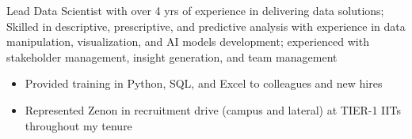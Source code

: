 
\item{Lead Data Scientist with over 4 yrs of experience in delivering data solutions; Skilled in descriptive, prescriptive, and predictive analysis with experience in data manipulation, visualization, and AI models development; experienced with stakeholder management, insight generation, and team management}







\vspace{.3px}
\vspace{.3px}








\vspace{.3px}
\begin{itemize}
    \item Provided training in Python, SQL, and Excel to colleagues and new hires
    \item Represented Zenon in recruitment drive (campus and lateral) at TIER-1 IITs throughout my tenure
\end{itemize}
\vspace{.3px}
